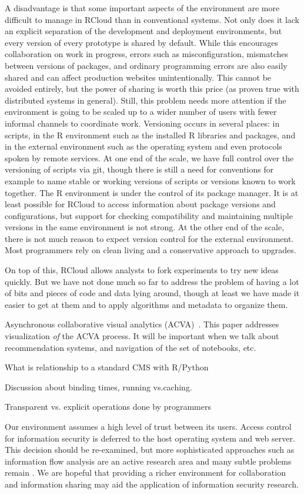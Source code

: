 A disadvantage is that some important aspects of the environment
are more difficult to manage in RCloud than in conventional systems.
Not only does it lack an explicit separation of the development and
deployment environments, but every version of every prototype is
shared by default. While this encourages collaboration on work
in progress, errors such as misconfiguration, mismatches between
versions of packages, and ordinary programming errors are also
easily shared and can affect production websites unintentionally.
This cannot be avoided entirely, but the power of sharing is worth
this price (as proven true with distributed systems in general).
Still, this problem needs more attention if the environment is
going to be scaled up to a wider number of users with fewer
informal channels to coordinate work. 
Versioning occurs in several places: in scripts, in the R environment
such as the installed R libraries and packages, and in the external
environment such as the operating system and even protocols spoken by
remote services. At one end of the scale, we have full control over the
versioning of scripts via git, though there is still a need for conventions
for example to name stable or working versions of scripts or versions known
to work together. The R environment is under the control of its package
manager. It is at least possible for RCloud to access information about
package versions and configurations, but support for checking compatibility
and maintaining multiple versions in the same environment is not strong.
At the other end of the scale, there is not much reason to expect version
control for the external environment. Most programmers rely on clean living
and a conservative approach to upgrades.

On top of this, RCloud allows analysts to fork experiments to try
new ideas quickly. But we have not done much so far to address the
problem of having a lot of bits and pieces of code and data lying
around, though at least we have made it easier to get at them and
to apply algorithms and metadata to organize them.

Asynchronous collaborative visual analytics
(ACVA)~\cite{Chen:2011:SEC}. This paper addresses visualization
\emph{of} the ACVA process. It will be important when we talk about
recommendation systems, and navigation of the set of notebooks, etc.

What is relationship to a standard CMS with R/Python

Discussion about binding times, running vs.caching.

Transparent vs. explicit operations done by programmers

Our environment assumes a high level of trust between its users.
Access control for information security is deferred to the host
operating system and web server. This decision should be re-examined,
but more sophisticated approaches such as information flow analysis
are an active research area and many subtle problems remain
\cite{Moore:2011:SAF}. We are hopeful that providing a richer
environment for collaboration and information sharing may aid
the application of information security research.

